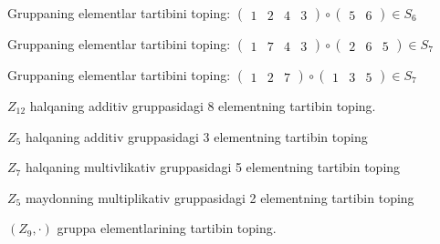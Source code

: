 Gruppaning elementlar tartibini toping: \(\begin{pmatrix}
1 & 2 & 4 & 3
\end{pmatrix} \circ \begin{pmatrix}
5 & 6
\end{pmatrix} \in S_{6}\)

Gruppaning elementlar tartibini toping: \(\begin{pmatrix}
1 & 7 & 4 & 3
\end{pmatrix} \circ \begin{pmatrix}
2 & 6 & 5
\end{pmatrix} \in S_{7}\)

Gruppaning elementlar tartibini toping: \(\begin{pmatrix}
1 & 2 & 7
\end{pmatrix} \circ \begin{pmatrix}
1 & 3 & 5
\end{pmatrix} \in S_{7}\)

\(Z_{12}\) halqaning additiv gruppasidagi 8 elementning tartibin toping.

\(Z_{5}\) halqaning additiv gruppasidagi 3 elementning tartibin toping

\(Z_{7}\) halqaning multivlikativ gruppasidagi 5 elementning tartibin toping

\(Z_{5}\) maydonning multiplikativ gruppasidagi 2 elementning tartibin toping

\(\left( Z_{9}, \cdot \right)\) gruppa elementlarining tartibin toping.